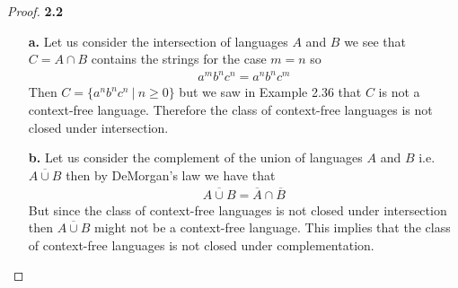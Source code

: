 \documentclass[11pt]{article}
\theoremstyle{definition}
\begin{document}
\begin{proof}{\textbf{2.2}}
\begin{itemize}
    \item [\textbf{a.}] Let us consider the intersection of languages $A$ and
    $B$ we see that $C = A \cap B$ contains the strings for the case $m = n$ so
    \begin{align*}
        a^mb^nc^n = a^nb^nc^m
    \end{align*}
    Then $C = \{a^nb^nc^n~|~n \geq 0\}$ but we saw in Example 2.36 that $C$ is
    not a context-free language. Therefore the class of context-free languages 
    is not closed under intersection.
    \item[\textbf{b.}] Let us consider the complement of the union of
    languages $A$ and $B$ i.e. $\overline{A \cup B}$ then by DeMorgan's law 
    we have that
    \begin{align*}
        \overline{A \cup B} = \overline{A}\cap\overline{B}
    \end{align*}
    But since the class of context-free languages is not closed under
    intersection then $\overline{A \cup B}$ might not be a context-free
    language. This implies that the class of context-free languages is not
    closed under complementation.
\end{itemize}
\end{proof}
\cleardoublepage
\end{document}
